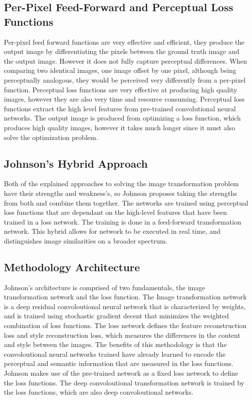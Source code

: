 \documentclass[12pt]{article}
\begin{document}
\subsection{Per-Pixel Feed-Forward and Perceptual Loss Functions}
Per-pixel feed forward functions are very effective and efficient, they produce the output image by differentiating the pixels between the ground truth image and the output image. However it does not fully capture perceptual differences. When comparing two identical images, one image offset by one pixel, although being perceptually analogous, they would be perceived very differently from a per-pixel function. Perceptual loss functions are very effective at producing high quality images, however they are also very time and resource consuming. Perceptual loss functions extract the high level features from pre-trained convolutional neural networks. The output image is produced from optimizing a loss function, which produces high quality images, however it takes much longer since it must also solve the optimization problem.

\subsection{Johnson's Hybrid Approach}
Both of the explained approaches to solving the image transformation problem have their strengths and weakness's, so Johnson proposes taking the strengths from both and combine them together. The networks are trained using perceptual loss functions that are dependant on the high-level features that have been trained in a loss network. The training is done in a feed-forward transformation network. This hybrid allows for network to be executed in real time, and distinguishes image similarities on a broader spectrum.

\subsection{Methodology Architecture}
Johnson's architecture is comprised of two fundamentals, the image transformation network and the loss function. The Image transformation network is a deep residual convoloutional neural network that is characterized by weights, and is trained using stochastic gradient decent that minimizes the weighted combination of loss functions. The loss network defines the feature reconstruction loss and style reconstruction loss, which measures the differences in the content and style between the images. The benefits of this methodology is that the convoloutional neural networks trained have already learned to encode the perceptual and semantic information that are measured in the loss functions. Johnson makes use of the pre-trained network as a fixed loss network to define the loss functions. The deep convoloutional transformation network is trained by the loss functions, which are also deep convoloutional networks. \cite{Johnson}
\end{document}
